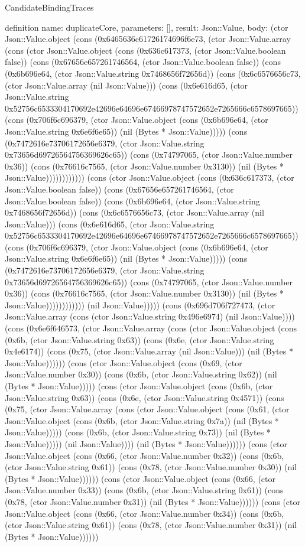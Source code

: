 \begin{lexlean}{CandidateBindingTraces}
\begin{semanticmodule}
definition{
 name: duplicateCore,
 parameters: [],
 result: Json::Value,
 body: (ctor Json::Value.object (cons (0x6465636c61726174696f6e73, (ctor Json::Value.array (cons (ctor Json::Value.object (cons (0x636c617373, (ctor Json::Value.boolean false)) (cons (0x67656e657261746564, (ctor Json::Value.boolean false)) (cons (0x6b696e64, (ctor Json::Value.string 0x7468656f72656d)) (cons (0x6c6576656c73, (ctor Json::Value.array (nil Json::Value))) (cons (0x6e616d65, (ctor Json::Value.string 0x52756c6533304170692e42696e64696e67466978747572652e7265666c6578697665)) (cons (0x706f6c696379, (ctor Json::Value.object (cons (0x6b696e64, (ctor Json::Value.string 0x6e6f6e65)) (nil (Bytes * Json::Value))))) (cons (0x7472616e73706172656e6379, (ctor Json::Value.string 0x73656d69726564756369626c65)) (cons (0x74797065, (ctor Json::Value.number 0x36)) (cons (0x76616c7565, (ctor Json::Value.number 0x3130)) (nil (Bytes * Json::Value)))))))))))) (cons (ctor Json::Value.object (cons (0x636c617373, (ctor Json::Value.boolean false)) (cons (0x67656e657261746564, (ctor Json::Value.boolean false)) (cons (0x6b696e64, (ctor Json::Value.string 0x7468656f72656d)) (cons (0x6c6576656c73, (ctor Json::Value.array (nil Json::Value))) (cons (0x6e616d65, (ctor Json::Value.string 0x52756c6533304170692e42696e64696e67466978747572652e7265666c6578697665)) (cons (0x706f6c696379, (ctor Json::Value.object (cons (0x6b696e64, (ctor Json::Value.string 0x6e6f6e65)) (nil (Bytes * Json::Value))))) (cons (0x7472616e73706172656e6379, (ctor Json::Value.string 0x73656d69726564756369626c65)) (cons (0x74797065, (ctor Json::Value.number 0x36)) (cons (0x76616c7565, (ctor Json::Value.number 0x3130)) (nil (Bytes * Json::Value)))))))))))) (nil Json::Value))))) (cons (0x696d706f727473, (ctor Json::Value.array (cons (ctor Json::Value.string 0x496e6974) (nil Json::Value)))) (cons (0x6e6f646573, (ctor Json::Value.array (cons (ctor Json::Value.object (cons (0x6b, (ctor Json::Value.string 0x63)) (cons (0x6e, (ctor Json::Value.string 0x4e6174)) (cons (0x75, (ctor Json::Value.array (nil Json::Value))) (nil (Bytes * Json::Value)))))) (cons (ctor Json::Value.object (cons (0x69, (ctor Json::Value.number 0x30)) (cons (0x6b, (ctor Json::Value.string 0x62)) (nil (Bytes * Json::Value))))) (cons (ctor Json::Value.object (cons (0x6b, (ctor Json::Value.string 0x63)) (cons (0x6e, (ctor Json::Value.string 0x4571)) (cons (0x75, (ctor Json::Value.array (cons (ctor Json::Value.object (cons (0x61, (ctor Json::Value.object (cons (0x6b, (ctor Json::Value.string 0x7a)) (nil (Bytes * Json::Value))))) (cons (0x6b, (ctor Json::Value.string 0x73)) (nil (Bytes * Json::Value))))) (nil Json::Value)))) (nil (Bytes * Json::Value)))))) (cons (ctor Json::Value.object (cons (0x66, (ctor Json::Value.number 0x32)) (cons (0x6b, (ctor Json::Value.string 0x61)) (cons (0x78, (ctor Json::Value.number 0x30)) (nil (Bytes * Json::Value)))))) (cons (ctor Json::Value.object (cons (0x66, (ctor Json::Value.number 0x33)) (cons (0x6b, (ctor Json::Value.string 0x61)) (cons (0x78, (ctor Json::Value.number 0x31)) (nil (Bytes * Json::Value)))))) (cons (ctor Json::Value.object (cons (0x66, (ctor Json::Value.number 0x34)) (cons (0x6b, (ctor Json::Value.string 0x61)) (cons (0x78, (ctor Json::Value.number 0x31)) (nil (Bytes * Json::Value)))))) }
\end{semanticmodule}
\end{lexlean}
